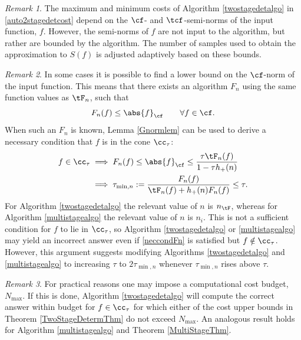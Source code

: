 \documentclass[]{elsarticle}
\theoremstyle{definition}
\theoremstyle{remark}
\newtheorem{rem}{Remark}
\newcommand{\Fnorm}[1]{\abs{#1}_{\cf}}
\begin{document}
\begin{rem} The maximum and minimum costs of Algorithm \ref{twostagedetalgo} in \eqref{auto2stagedetcost} depend on the $\cf$- and $\tcf$-semi-norms of the input function, $f$.  However, the semi-norms of $f$ are not input to the algorithm, but rather are bounded by the algorithm.  The number of samples used to obtain the approximation to $S(f)$ is adjusted adaptively based on these bounds.
\end{rem}


\begin{rem} \label{neccondrem} In some cases it is possible to find a lower bound on the $\cf$-norm of the input function.  This means that there exists an algorithm $F_n$ using the same function values as $\tF_n$, such that
\[
F_n(f) \le \Fnorm{f} \qquad \forall f \in \cf.
\]
When such an $F_n$ is known, Lemma \ref{Gnormlem} can be used to derive a necessary condition that $f$ is in the cone $\cc_\tau$:
\begin{align}
\nonumber
f \in \cc_\tau 
& \implies F_n(f) \le \Fnorm{f} \le \frac{\tau \tF_n(f)}{1-\tau h_+(n)}\\
& \implies \tau_{\min,n}:= \frac{F_n(f)}{\tF_n(f) + h_+(n) F_n(f)} \le \tau.
\label{neccondFn}
\end{align}
For Algorithm \ref{twostagedetalgo} the relevant value of $n$ is $n_{\tF}$, whereas for Algorithm \ref{multistagealgo} the relevant value of $n$ is $n_i$.
This is not a sufficient condition for $f$ to lie in $\cc_{\tau}$, so Algorithm \ref{twostagedetalgo} or \ref{multistagealgo} may yield an incorrect answer even if \eqref{neccondFn} is satisfied but $f \notin \cc_{\tau}$.  However, this argument suggests modifying Algorithms \ref{twostagedetalgo} and \ref{multistagealgo} to increasing $\tau$ to $2 \tau_{\min,n}$ whenever  $\tau_{\min,n}$ rises above $\tau$. 
\end{rem}

\begin{rem} \label{Nmaxrem}  For practical reasons one may impose a computational cost budget, $N_{\max}$.  If this is done, Algorithm \ref{twostagedetalgo} will compute the correct answer within budget for $f \in \cc_{\tau}$ for which either of the cost upper bounds in Theorem \ref{TwoStageDetermThm} do not exceed $N_{\max}$.  An analogous result holds for Algorithm \ref{multistagealgo} and Theorem \ref{MultiStageThm}.
\end{rem}
\end{document}
